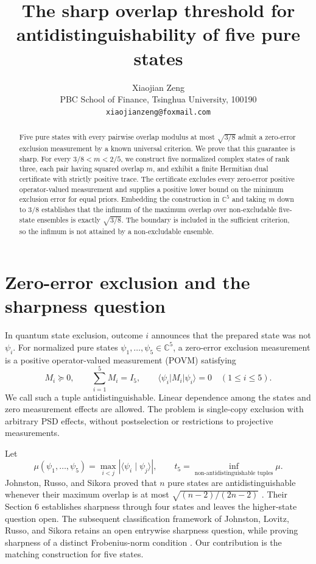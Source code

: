 \documentclass[11pt]{article}
\title{The sharp overlap threshold for antidistinguishability of five pure states}
\author{Xiaojian Zeng\\
\small PBC School of Finance, Tsinghua University, 100190\\
\small \texttt{xiaojianzeng@foxmail.com}}
\date{}
\newcommand{\ket}[1]{\lvert #1\rangle}
\newcommand{\bra}[1]{\langle #1\rvert}
\newcommand{\C}{\mathbb C}
\begin{document}
\maketitle
\begin{abstract}
Five pure states with every pairwise overlap modulus at most
$\sqrt{3/8}$ admit a zero-error exclusion measurement by a known universal
criterion. We prove that this guarantee is sharp. For every
$3/8<m<2/5$, we construct five normalized complex states of rank three,
each pair having squared overlap $m$, and exhibit a finite Hermitian
dual certificate with strictly positive trace. The certificate excludes
every zero-error positive operator-valued measurement and supplies a
positive lower bound on the minimum exclusion error for equal priors.
Embedding the construction in $\C^5$ and taking $m$ down to $3/8$
establishes that the infimum of the maximum overlap over non-excludable
five-state ensembles is exactly $\sqrt{3/8}$. The boundary is included in
the sufficient criterion, so the infimum is not attained by a
non-excludable ensemble.
\end{abstract}

\section{Zero-error exclusion and the sharpness question}
In quantum state exclusion, outcome $i$ announces that the prepared
state was not $\psi_i$. For normalized pure states
$\psi_1,\ldots,\psi_5\in\C^5$, a zero-error exclusion measurement is a
positive operator-valued measurement (POVM) satisfying
\begin{equation}
 M_i\succeq0,\qquad \sum_{i=1}^5 M_i=I_5,\qquad
 \bra{\psi_i}M_i\ket{\psi_i}=0\quad (1\leq i\leq5).
 \label{eq:povm}
\end{equation}
We call such a tuple antidistinguishable. Linear dependence among the
states and zero measurement effects are allowed. The problem is
single-copy exclusion with arbitrary PSD effects, without postselection
or restrictions to projective measurements.

Let
\begin{equation}
 \mu(\psi_1,\ldots,\psi_5)=
 \max_{i<j}|\langle\psi_i\mid\psi_j\rangle|,\qquad
 t_5=\inf_{\text{non-antidistinguishable tuples}}\mu .
 \label{eq:threshold}
\end{equation}
Johnston, Russo, and Sikora proved that $n$ pure states are
antidistinguishable whenever their maximum overlap is at most
$\sqrt{(n-2)/(2n-2)}$ \cite[Corollary 5.4]{JRS25}.
Their Section 6 establishes sharpness through four states and leaves
the higher-state question open. The subsequent classification framework
of Johnston, Lovitz, Russo, and Sikora retains an open entrywise
sharpness question, while proving sharpness of a distinct
Frobenius-norm condition \cite[Section 1.1 and Section 3]{JLRS26}.
Our contribution is the matching construction for five states.
\end{document}
